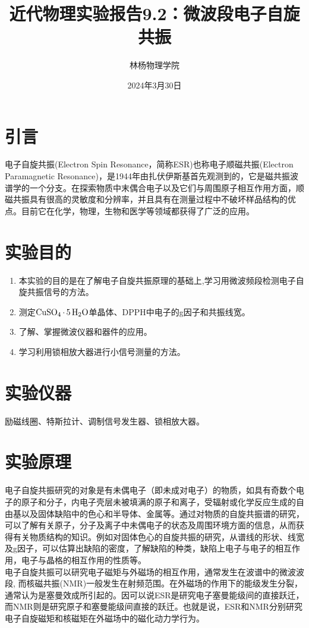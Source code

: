 \documentclass[a4paper]{article}
\title{近代物理实验报告9.2：微波段电子自旋共振}
\author{林杨\quad 211840092\quad 物理学院}
\date{2024年3月30日}
\begin{document}
\maketitle


\section{引言}
电子自旋共振(Electron Spin Resonance，简称ESR)也称电子顺磁共振(Electron Paramagnetic Resonance)，是1944年由扎伏伊斯基首先观测到的，它是磁共振波谱学的一个分支。在探索物质中末偶合电子以及它们与周围原子相互作用方面，顺磁共振具有很高的灵敏度和分辨率，并且具有在测量过程中不破坏样品结构的优点。目前它在化学，物理，生物和医学等领域都获得了广泛的应用。

\section{实验目的}
\begin{enumerate}
\item 本实验的目的是在了解电子自旋共振原理的基础上,学习用微波频段检测电子自旋共振信号的方法。
\item 测定$\ce{CuSO_4 . 5H_2O}$单晶体、DPPH中电子的g因子和共振线宽。
\item 了解、掌握微波仪器和器件的应用。
\item 学习利用锁相放大器进行小信号测量的方法。
\end{enumerate}

\section{实验仪器}
励磁线圈、特斯拉计、调制信号发生器、锁相放大器。

\section{实验原理}
电子自旋共振研究的对象是有未偶电子（即未成对电子）的物质，如具有奇数个电子的原子和分子，内电子壳层未被填满的原子和离子，受辐射或化学反应生成的自由基以及固体缺陷中的色心和半导体、金属等。通过对物质的自旋共振谱的研究，可以了解有关原子，分子及离子中未偶电子的状态及周围环境方面的信息，从而获得有关物质结构的知识。例如对固体色心的自旋共振的研究，从谱线的形状、线宽及g因子，可以估算出缺陷的密度，了解缺陷的种类，缺陷上电子与电子的相互作用，电子与晶格的相互作用的性质等。\\
电子自旋共振可以研究电子磁矩与外磁场的相互作用，通常发生在波谱中的微波波段, 而核磁共振(NMR)一般发生在射频范围。在外磁场的作用下的能级发生分裂，通常认为是塞曼效成所引起的。因可以说ESR是研究电子塞曼能级间的直接跃迁，而NMR则是研究原子和塞曼能级间直接的跃迁。也就是说，ESR和NMR分别研究电子自旋磁矩和核磁矩在外磁场中的磁化动力学行为。
\end{document}
